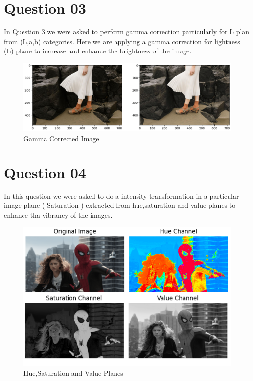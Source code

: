 \documentclass[11pt,a4paper]{article}
\begin{document}
\section{Question 03}

In Question 3 we were asked to perform gamma correction particularly for L plan from (L,a,b) categories. Here we are applying a gamma correction for lightness (L) plane to increase and enhance the brightness of the image.
\lstset{style=mystyle}


\newpage

{\begin{figure}[h]
    \centering
    \includegraphics[width=1.0\linewidth]{images/gamma.png}
    \caption{Gamma Corrected Image}
\end{figure}}

\section{Question 04}

In this question we were asked to do a intensity transformation in a particular image plane ( Saturation ) extracted from hue,saturation and value planes to enhance tha vibrancy of the images.

\lstset{style=mystyle}


{\begin{figure}[h]
    \centering
    \includegraphics[width=1.0\linewidth]{images/4.png}
    \caption{Hue,Saturation and Value Planes}
\end{figure}}
\end{document}
